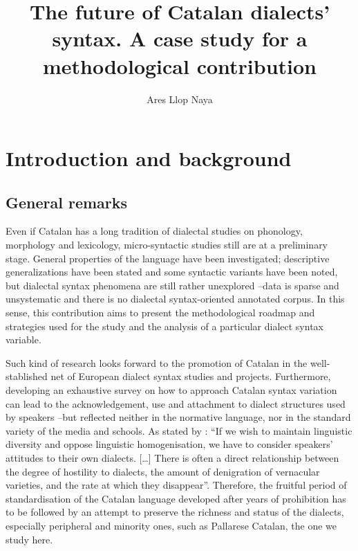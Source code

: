 \documentclass[output=paper]{LSP/langsci}
\begin{document}
\title{The future of Catalan dialects’ syntax. A case study for a methodological contribution}
\author{Ares Llop Naya}
% 
 

\section{Introduction and background}

\subsection{ General remarks}
Even if Catalan has a long tradition of dialectal studies on phonology, morphology and lexicology, micro-syntactic studies still are at a preliminary stage. General properties of the language have been investigated; descriptive generalizations have been stated and some syntactic variants have been noted, but dialectal syntax phenomena are still rather unexplored –data is sparse and unsystematic and there is no dialectal syntax-oriented annotated corpus. In this sense, this contribution aims to present the methodological roadmap and strategies used for the study and the analysis of a particular dialect syntax variable.

Such kind of research looks forward to the promotion of Catalan in the well-stablished net of European dialect syntax studies and projects. Furthermore, developing an exhaustive survey on how to approach Catalan syntax variation can lead to the acknowledgement, use and attachment to dialect structures used by speakers –but reflected neither in the normative language, nor in the standard variety of the media and schools. As stated by \citet[30]{trudgill_sociolinguistic_2002}: “If we wish to maintain linguistic diversity and oppose linguistic homogenisation, we have to consider speakers’ attitudes to their own dialects. […] There is often a direct relationship between the degree of hostility to dialects, the amount of denigration of vernacular varieties, and the rate at which they disappear”. Therefore, the fruitful period of standardisation of the Catalan language developed after years of prohibition has to be followed by an attempt to preserve the richness and status of the dialects, especially peripheral and minority ones, such as Pallarese Catalan, the one we study here.
\end{document}
